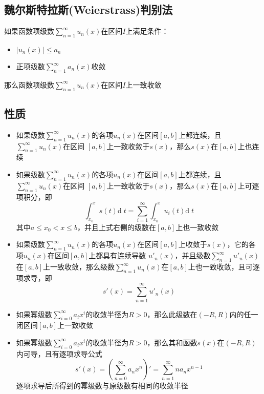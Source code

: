 \documentclass[UTF8]{ctexart}
\newcommand{\dif}[1]{{\mathrm{d}\;\!#1}}
\newcommand{\abs}[1]{{\left|{#1}\right|}}
\begin{document}
\subsection*{魏尔斯特拉斯(Weierstrass)判别法}
如果函数项级数$\displaystyle\sum_{n=1}^\infty u_n(x)$在区间$I$上满足条件：
\begin{itemize}
  \item $\abs{u_n(x)}\le a_n$
  \item 正项级数$\displaystyle\sum_{n=1}^\infty a_n(x)$收敛
\end{itemize}
那么函数项级数$\displaystyle\sum_{n=1}^\infty u_n(x)$在区间$I$上一致收敛

\subsection*{性质}
\begin{itemize}
  \item 如果级数$\displaystyle\sum_{n=1}^\infty u_n(x)$的各项$u_n(x)$在区间$[a,b]$上都连续，且$\displaystyle\sum_{n=1}^\infty u_n(x)$在区间
  $[a,b]$上一致收敛于$s(x)$，那么$s(x)$在$[a,b]$上也连续
  \item 如果级数$\displaystyle\sum_{n=1}^\infty u_n(x)$的各项$u_n(x)$在区间$[a,b]$上都连续，且$\displaystyle\sum_{n=1}^\infty u_n(x)$在区间
  $[a,b]$上一致收敛于$s(x)$，那么$s(x)$在$[a,b]$上可逐项积分，即
  \[\int_{x_0}^xs(t)\dif{t}=\sum_{i=1}^\infty\int_{x_0}^xu_i(t)\dif{t}\]
  其中$a\le x_0<x\le b$，并且上式右侧的级数在$[a,b]$上也一致收敛
  \item 如果级数$\displaystyle\sum_{n=1}^\infty u_n(x)$的各项$u_n(x)$在区间$[a,b]$上收敛于$s(x)$，它的各项$u_n(x)$在区间$[a,b]$上都具有连续导数
  $u'_n(x)$，并且级数$\sum_{n=1}^\infty u'_n(x)$在$[a,b]$上一致收敛，那么级数$\sum_{n=1}^\infty u_n(x)$在$[a,b]$上也一致收敛，且可逐项求导，即
  \[s'(x)=\sum_{n=1}^\infty u'_n(x)\]
  \item 如果幂级数$\displaystyle\sum_{i=0}^\infty a_ix^i$的收敛半径为$R>0$，那么此级数在$(-R,R)$内的任一闭区间$[a,b]$上一致收敛
  \item 如果幂级数$\displaystyle\sum_{i=0}^\infty a_ix^i$的收敛半径为$R>0$，那么其和函数$s(x)$在$(-R,R)$内可导，且有逐项求导公式
  \[s'(x)=\left(\sum_{n=0}^\infty a_nx^n\right)'=\sum_{n=1}^\infty na_nx^{n-1}\]
  逐项求导后所得到的幂级数与原级数有相同的收敛半径
\end{itemize}
\end{document}
